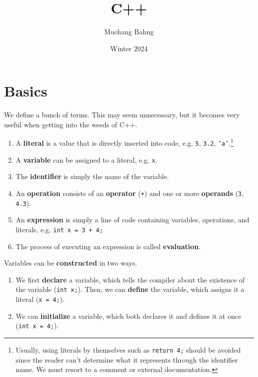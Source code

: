 \documentclass{article}
\begin{document}
\title{C++}
\author{Muchang Bahng}
\date{Winter 2024}

\maketitle
\tableofcontents
\pagebreak

\section{Basics} 

  We define a bunch of terms. This may seem unnecessary, but it becomes very useful when getting into the weeds of C++. 

  \begin{definition}[Variables]
    \begin{enumerate}
      \item A \textbf{literal} is a value that is directly inserted into code, e.g. \texttt{5}, \texttt{3.2}, \texttt{'a'}.\footnote{Usually, using literals by themselves such as \texttt{return 4;} should be avoided since the reader can't determine what it represents through the identifier name. We must resort to a comment or external documentation. } 
      \item A \textbf{variable} can be assigned to a literal, e.g. \texttt{x}. 
      \item The \textbf{identifier} is simply the name of the variable. 
      \item An \textbf{operation} consists of an \textbf{operator} (\texttt{+}) and one or more \textbf{operands} (\texttt{3}, \texttt{4.3}).  
      \item An \textbf{expression} is simply a line of code containing variables, operations, and literals, e.g. \texttt{int x = 3 + 4;} 
      \item The process of executing an expression is called \textbf{evaluation}. 
    \end{enumerate}

    Variables can be \textbf{constructed} in two ways. 
    \begin{enumerate}
      \item We first \textbf{declare} a variable, which tells the compiler about the existence of the variable (\texttt{int x;}). Then, we can \textbf{define} the variable, which assigns it a literal (\texttt{x = 4;}). 
      \item We can \textbf{initialize} a variable, which both declares it and defines it at once (\texttt{int x = 4;}).
    \end{enumerate}
  \end{definition}
\end{document}
